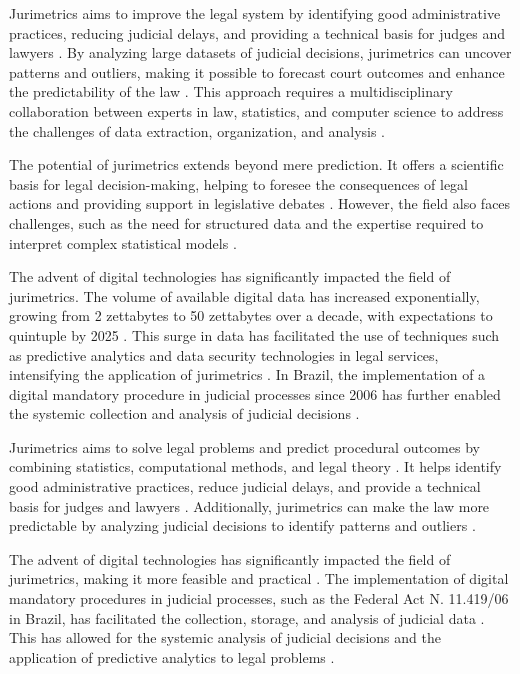 Jurimetrics aims to improve the legal system by identifying good administrative practices, reducing judicial delays, and providing a technical basis for judges and lawyers \cite{silva2023role}. By analyzing large datasets of judicial decisions, jurimetrics can uncover patterns and outliers, making it possible to forecast court outcomes and enhance the predictability of the law \cite{103390fi9040068}. This approach requires a multidisciplinary collaboration between experts in law, statistics, and computer science to address the challenges of data extraction, organization, and analysis \cite{103390fi9040068}.

The potential of jurimetrics extends beyond mere prediction. It offers a scientific basis for legal decision-making, helping to foresee the consequences of legal actions and providing support in legislative debates \cite{nunes2016jurimetria, por2013}. However, the field also faces challenges, such as the need for structured data and the expertise required to interpret complex statistical models \cite{103390fi9040068, l2010de}.

The advent of digital technologies has significantly impacted the field of jurimetrics. The volume of available digital data has increased exponentially, growing from 2 zettabytes to 50 zettabytes over a decade, with expectations to quintuple by 2025 \cite{silva2023role}. This surge in data has facilitated the use of techniques such as predictive analytics and data security technologies in legal services, intensifying the application of jurimetrics \cite{silva2023role}. In Brazil, the implementation of a digital mandatory procedure in judicial processes since 2006 has further enabled the systemic collection and analysis of judicial decisions \cite{103390fi9040068}.

Jurimetrics aims to solve legal problems and predict procedural outcomes by combining statistics, computational methods, and legal theory \cite{silva2023role}. It helps identify good administrative practices, reduce judicial delays, and provide a technical basis for judges and lawyers \cite{silva2023role}. Additionally, jurimetrics can make the law more predictable by analyzing judicial decisions to identify patterns and outliers \cite{103390fi9040068}.

The advent of digital technologies has significantly impacted the field of jurimetrics, making it more feasible and practical \cite{silva2023role, 103390fi9040068}. The implementation of digital mandatory procedures in judicial processes, such as the Federal Act N. 11.419/06 in Brazil, has facilitated the collection, storage, and analysis of judicial data \cite{103390fi9040068}. This has allowed for the systemic analysis of judicial decisions and the application of predictive analytics to legal problems \cite{silva2023role, 103390fi9040068}.

